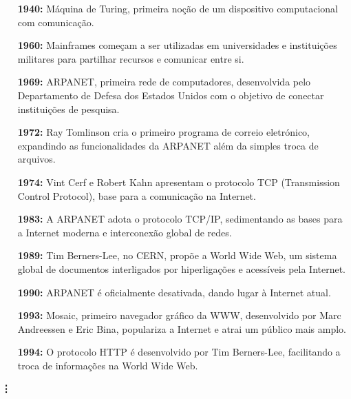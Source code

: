 \begin{enumerate} \small
    \item[\textbf{1940:}] Máquina de Turing, primeira noção de um dispositivo computacional com comunicação.
    
    \item[\textbf{1960:}] Mainframes começam a ser utilizadas em universidades e instituições militares para partilhar recursos e comunicar entre si.
    
    \item[\textbf{1969:}] ARPANET, primeira rede de computadores, desenvolvida pelo Departamento de Defesa dos Estados Unidos com o objetivo de conectar instituições de pesquisa.

    \item[\textbf{1972:}] Ray Tomlinson cria o primeiro programa de correio eletrónico, expandindo as funcionalidades da ARPANET além da simples troca de arquivos.
    
    \item[\textbf{1974:}] Vint Cerf e Robert Kahn apresentam o protocolo TCP (Transmission Control Protocol), base para a comunicação na Internet.
    
    \item[\textbf{1983:}] A ARPANET adota o protocolo TCP/IP, sedimentando as bases para a Internet moderna e interconexão global de redes.
        
    \item[\textbf{1989:}] Tim Berners-Lee, no CERN, propõe a World Wide Web, um sistema global de documentos interligados por hiperligações e acessíveis pela Internet.
    
    \item[\textbf{1990:}] ARPANET é oficialmente desativada, dando lugar à Internet atual.
    
    \item[\textbf{1993:}] Mosaic, primeiro navegador gráfico da WWW, desenvolvido por Marc Andreessen e Eric Bina, populariza a Internet e atrai um público mais amplo.
    
    \item[\textbf{1994:}] O protocolo HTTP é desenvolvido por Tim Berners-Lee, facilitando a troca de informações na World Wide Web.
\end{enumerate}

\hfil \textbf{\vdots}

